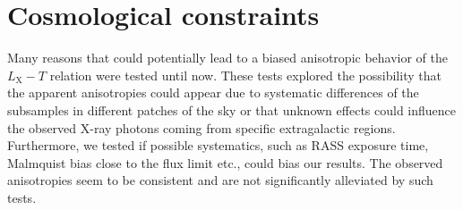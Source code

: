 \documentclass{aa}   %
\begin{document}




\section{Cosmological constraints} \label{cosmology}

Many reasons that could potentially lead to a biased anisotropic behavior of the $L_{\text{X}}-T$ relation were tested until now. These tests explored the possibility that the apparent anisotropies could appear due to systematic differences of the subsamples in different patches of the sky or that unknown effects could influence the observed X-ray photons coming from specific extragalactic regions. Furthermore, we tested if possible systematics, such as RASS exposure time, Malmquist bias close to the flux limit etc., could bias our results. The observed anisotropies seem to be consistent and are not significantly alleviated by such tests. 
\end{document}
